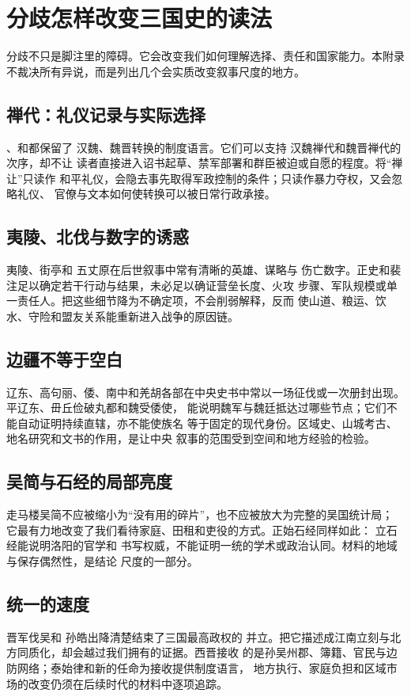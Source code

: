 \chapter{分歧怎样改变三国史的读法}
\label{app:debates}

分歧不只是脚注里的障碍。它会改变我们如何理解选择、责任和国家能力。本附录
不裁决所有异说，而是列出几个会实质改变叙事尺度的地方。

\section{禅代：礼仪记录与实际选择}

、和都保留了
汉魏、魏晋转换的制度语言。它们可以支持
{汉魏禅代}和魏晋禅代的次序，却不让
读者直接进入诏书起草、禁军部署和群臣被迫或自愿的程度。将“禅让”只读作
和平礼仪，会隐去事先取得军政控制的条件；只读作暴力夺权，又会忽略礼仪、
官僚与文本如何使转换可以被日常行政承接。

\section{夷陵、北伐与数字的诱惑}

夷陵、街亭和
五丈原在后世叙事中常有清晰的英雄、谋略与
伤亡数字。正史和裴注足以确定若干行动与结果，未必足以确证营垒长度、火攻
步骤、军队规模或单一责任人。把这些细节降为不确定项，不会削弱解释，反而
使山道、粮运、饮水、守险和盟友关系能重新进入战争的原因链。

\section{边疆不等于空白}

辽东、高句丽、倭、南中和羌胡各部在中央史书中常以一场征伐或一次册封出现。
平辽东、毌丘俭破丸都和魏受倭使，
能说明魏军与魏廷抵达过哪些节点；它们不能自动证明持续直辖，亦不能使族名
等于固定的现代身份。区域史、山城考古、地名研究和文书的作用，是让中央
叙事的范围受到空间和地方经验的检验。

\section{吴简与石经的局部亮度}

走马楼吴简不应被缩小为“没有用的碎片”，也不应被放大为完整的吴国统计局；
它最有力地改变了我们看待家庭、田租和吏役的方式。正始石经同样如此：
立石经能说明洛阳的官学和
书写权威，不能证明一统的学术或政治认同。材料的地域与保存偶然性，是结论
尺度的一部分。

\section{统一的速度}

晋军伐吴和
孙皓出降清楚结束了三国最高政权的
并立。把它描述成江南立刻与北方同质化，却会越过我们拥有的证据。西晋接收
的是孙吴州郡、簿籍、官民与边防网络；泰始律和新的任命为接收提供制度语言，
地方执行、家庭负担和区域市场的改变仍须在后续时代的材料中逐项追踪。
